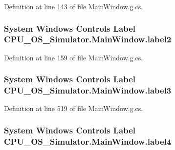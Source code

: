 Definition at line 143 of file Main\+Window.\+g.\+cs.

\hypertarget{class_c_p_u___o_s___simulator_1_1_main_window_a88c7b6748a5e198c673a3c3c5178d3b8}{}
\subsubsection[{label2}]{\setlength{\rightskip}{0pt plus 5cm}System Windows Controls Label C\+P\+U\+\_\+\+O\+S\+\_\+\+Simulator.\+Main\+Window.\+label2\hspace{0.3cm}{\ttfamily [package]}}\label{class_c_p_u___o_s___simulator_1_1_main_window_a88c7b6748a5e198c673a3c3c5178d3b8}


Definition at line 159 of file Main\+Window.\+g.\+cs.

\hypertarget{class_c_p_u___o_s___simulator_1_1_main_window_a94cf4fbdaebb09776745893c2bce1126}{}
\subsubsection[{label3}]{\setlength{\rightskip}{0pt plus 5cm}System Windows Controls Label C\+P\+U\+\_\+\+O\+S\+\_\+\+Simulator.\+Main\+Window.\+label3\hspace{0.3cm}{\ttfamily [package]}}\label{class_c_p_u___o_s___simulator_1_1_main_window_a94cf4fbdaebb09776745893c2bce1126}


Definition at line 519 of file Main\+Window.\+g.\+cs.

\hypertarget{class_c_p_u___o_s___simulator_1_1_main_window_a3473dc873d8c8d8f4bba6e83f5684299}{}
\subsubsection[{label4}]{\setlength{\rightskip}{0pt plus 5cm}System Windows Controls Label C\+P\+U\+\_\+\+O\+S\+\_\+\+Simulator.\+Main\+Window.\+label4\hspace{0.3cm}{\ttfamily [package]}}\label{class_c_p_u___o_s___simulator_1_1_main_window_a3473dc873d8c8d8f4bba6e83f5684299}


